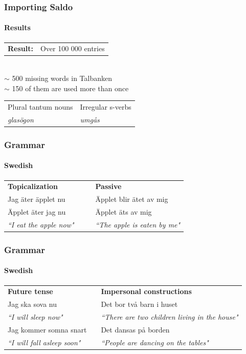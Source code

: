 \documentclass[10pt]{beamer}
\begin{document}
\begin{frame}
\frametitle{Importing Saldo}
\framesubtitle{Results} 
\vspace{5mm}
\begin{tabular}{ll}
\textbf{Result:} & Over 100 000 entries\\
\end{tabular}\\
\vspace{4mm}
\pause
$\sim$ 500 missing words in Talbanken\\
\pause
$\sim$ 150 of them are used more than once \\
\pause
\vspace{4mm}
\begin{tabular}{ll}
Plural tantum nouns & Irregular s-verbs \\
\emph{glasögon} & \emph{umgås}\\
\end{tabular}
\end{frame}

\begin{frame}
\frametitle{Grammar}
\framesubtitle{Swedish} 
\begin{tabular}{llll}
\textbf{Topicalization}& && \textbf{Passive}\\
Jag äter äpplet nu && &Äpplet blir ätet av mig \\
Äpplet äter jag nu &&& Äpplet äts av mig \\
\emph{``I eat the apple now"}& &&\emph{``The apple is eaten by me"}\\
\end{tabular}
\end{frame}

\begin{frame}
\frametitle{Grammar}
\framesubtitle{Swedish} 
\begin{tabular}{lll}
 \textbf{Future tense}  &&\textbf{Impersonal constructions} \\
Jag ska sova nu & &Det bor två barn i huset \\
\emph{``I will sleep now"} && \emph{``There are two children living in the house"} \\
Jag kommer somna snart &&Det dansas på borden  \\
\emph{``I will fall asleep soon"} &&\emph{``People are dancing on the tables"}  \\
\end{tabular}
\end{frame}
\end{document}

